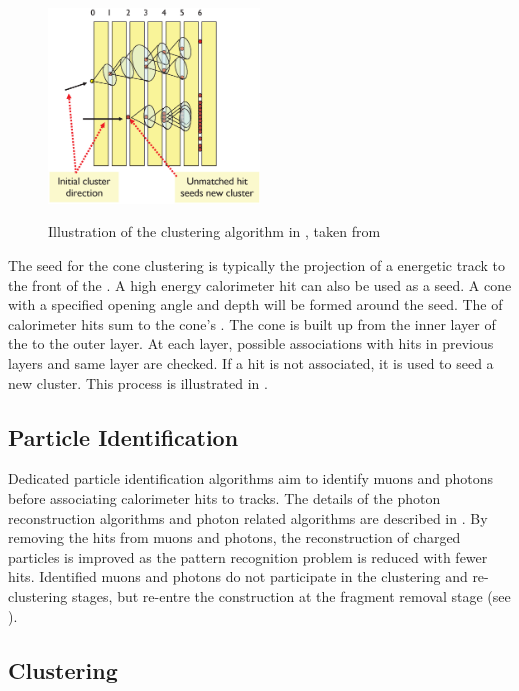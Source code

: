\begin{figure}[tbph]
\centering
{\includegraphics[width=0.5\textwidth]{pandora/coneClustering2}}%
\caption{Illustration of the clustering algorithm in \pandora, taken from \cite{Marshall:pandoraLC}}
\label{fig:pandoraConeClustering2}
\end{figure}

The seed for the cone clustering is typically the projection of a energetic track to the front of the \ECAL. A high  energy calorimeter hit can also be used as a seed. A cone with a specified opening angle and depth will be formed around the seed. The \fourMomentum of calorimeter hits sum to the cone's \fourMomentum. The cone is built up from the inner layer of the \ECAL to the outer layer. At each layer, possible associations with hits in previous layers and same layer are checked. If a hit is not associated, it is used to seed a new cluster. This process is illustrated in .


\subsection{Particle Identification}
\label{sec:particleID}

Dedicated particle identification algorithms aim to identify muons and photons before associating calorimeter hits to tracks. The details of the photon reconstruction algorithms and photon related algorithms are described in . By removing the hits from muons and photons, the reconstruction of charged particles is improved as the pattern recognition problem is reduced with fewer hits. Identified muons and photons do not participate in the clustering and re-clustering stages, but re-entre the construction at the fragment removal stage (see ).

\subsection{Clustering}

